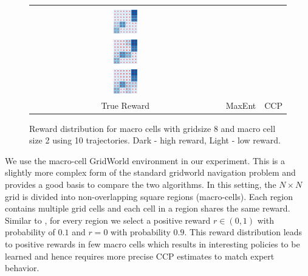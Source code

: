 \documentclass{article}
\def\MSHangBox#1{%
\begin{minipage}[t]{\textwidth}%
\begin{tabbing} %
~\\[-\baselineskip] %
#1 %
\end{tabbing}%
\end{minipage}} %
\begin{document}
\begin{figure}[t]
\centering
  \begin{tabular}{ccc}
    \MSHangBox{\includegraphics[width=0.13\textwidth]{images/gridworld/macro_cells/grid_8_macro_2/reward_map/true_reward_trim.pdf}}&
    \MSHangBox{\includegraphics[width=0.13\textwidth]{images/gridworld/macro_cells/grid_8_macro_2/reward_map/maxent_reward_trim.pdf}}&
    \MSHangBox{\includegraphics[width=0.13\textwidth]{images/gridworld/macro_cells/grid_8_macro_2/reward_map/ccp_reward_2_trim.pdf}} \\
    True Reward & MaxEnt & CCP \\
    \end{tabular}
    \caption{ Reward distribution for macro cells with gridsize 8 and macro cell size 2 using 10 trajectories. Dark - high reward, Light - low reward. }
    \label{fig:img_reward_map_gridworld_macro_cell}
\end{figure}


We use the macro-cell GridWorld environment \cite{abbeel2004apprenticeship} in our experiment. This is a slightly more complex form of the standard gridworld navigation problem and provides a good basis to compare the two algorithms. 
In this setting, the $N \times N$ grid is divided into non-overlapping square regions (macro-cells). Each region contains multiple grid cells and each cell in a region shares the same reward. Similar to \cite{abbeel2004apprenticeship}, for every region we select a positive reward $r \in (0, 1)$ with probability of $0.1$ and $r = 0$ with probability $0.9$. This reward distribution leads to positive rewards in few macro cells which results in interesting policies to be learned and hence requires more precise CCP estimates to match expert behavior.
\end{document}
